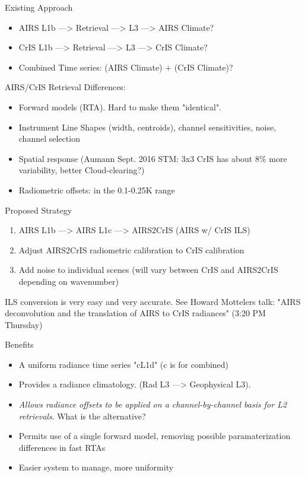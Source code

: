 \documentclass[10pt,t]{beamer}
\begin{document}
\begin{frame}[label={sec:orga95dadf}]{Existing Approach}
\begin{itemize}
\item AIRS L1b ---> Retrieval ---> L3 ---> AIRS Climate?
\item CrIS L1b ---> Retrieval ---> L3 ---> CrIS Climate?
\item Combined Time series: (AIRS Climate) + (CrIS Climate)?
\end{itemize}

\begin{block}{AIRS/CrIS Retrieval Differences:}
\begin{itemize}
\item Forward models (RTA).  Hard to make them "identical".
\item Instrument Line Shapes (width, centroids), channel sensitivities, noise, channel selection
\item Spatial response (Aumann Sept. 2016 STM: 3x3 CrIS has about 8\% more variability, better Cloud-clearing?)
\item Radiometric offsets: in the 0.1-0.25K range
\end{itemize}
\end{block}
\end{frame}

\begin{frame}[label={sec:org8c8ad53}]{Proposed Strategy}
\begin{enumerate}
\item AIRS L1b ---> AIRS L1c ---> AIRS2CrIS (AIRS w/ CrIS ILS)
\item Adjust AIRS2CrIS radiometric calibration to CrIS calibration
\item Add noise to individual scenes (will vary between CrIS and AIRS2CrIS depending on wavenumber)
\end{enumerate}
\footnotesize
ILS conversion is very easy and very accurate. See Howard Mottelers talk: "AIRS deconvolution and the translation of AIRS to CrIS radiances" (3:20 PM Thursday)

\normalsize
\begin{block}{Benefits}
\begin{itemize}
\item A uniform radiance time series "cL1d" (c is for combined)
\item Provides a radiance climatology.  (Rad L3 ---> Geophysical L3).
\item \emph{Allows radiance offsets to be applied on a channel-by-channel basis for L2 retrievals}.  What is the alternative?
\item Permits use of a single forward model, removing possible paramaterization differences in fast RTAs
\item Easier system to manage, more uniformity
\end{itemize}
\end{block}
\end{frame}
\end{document}
